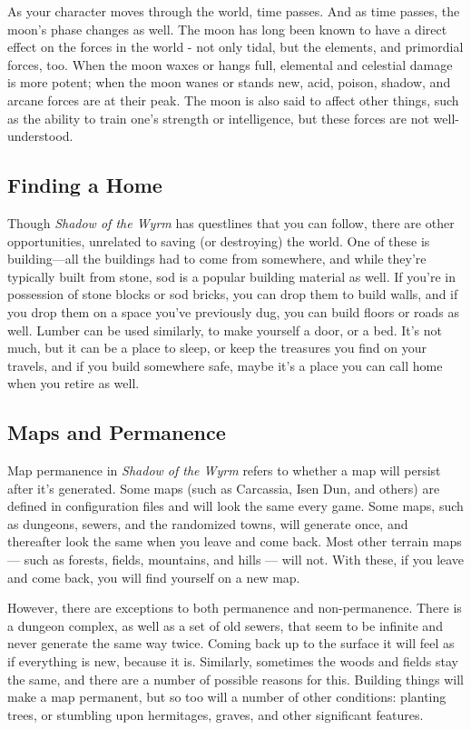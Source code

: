 As your character moves through the world, time passes.  And as time
passes, the moon's phase changes as well.  The moon has long been known to
have a direct effect on the forces in the world - not only tidal, but the
elements, and primordial forces, too.  When the moon waxes or hangs full, 
elemental and celestial damage is more potent; when the moon wanes or
stands new, acid, poison, shadow, and arcane forces are at their peak.
The moon is also said to affect other things, such as the ability to train
one's strength or intelligence, but these forces are not well-understood.

\subsection{Finding a Home}

Though {\it Shadow of the Wyrm} has questlines that you can follow, there are
other opportunities, unrelated to saving (or destroying) the world.  One of
these is building---all the buildings had to come from somewhere, and while
they're typically built from stone, sod is a popular building material as
well.  If you're in possession of stone blocks or sod bricks, you can drop
them to build walls, and if you drop them on a space you've previously dug,
you can build floors or roads as well.  Lumber can be used similarly, to
make yourself a door, or a bed.  It's not much, but it can be a place to
sleep, or keep the treasures you find on your travels, and if you build 
somewhere safe, maybe it's a place you can call home when you retire as well.

\subsection{Maps and Permanence}

Map permanence in {\it Shadow of the Wyrm} refers to whether a map will
persist after it's generated. Some maps (such as Carcassia, Isen Dun, and
others) are defined in configuration files and will look the same every
game. Some maps, such as dungeons, sewers, and the randomized towns, will 
generate once, and thereafter look the same when you leave and come back. 
Most other terrain maps --- such as forests, fields, mountains, and hills
--- will not. With these, if you leave and come back, you will find yourself
on a new map.

However, there are exceptions to both permanence and non-permanence. There
is a dungeon complex, as well as a set of old sewers, that seem to be infinite
and never generate the same way twice. Coming back up to the surface it will
feel as if everything is new, because it is. Similarly, sometimes the woods
and fields stay the same, and there are a number of possible reasons for this.
Building things will make a map permanent, but so too will a number of other
conditions: planting trees, or stumbling upon hermitages, graves, and other
significant features.
